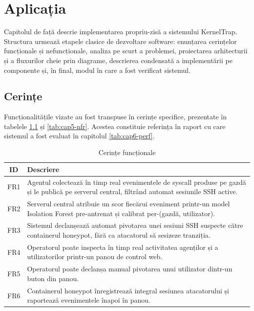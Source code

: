 
\chapter{Aplicația}

Capitolul de față descrie implementarea propriu-zisă a sistemului KernelTrap.
Structura urmează etapele clasice de dezvoltare software: enunțarea
cerințelor funcționale și nefuncționale, analiza pe scurt a problemei,
proiectarea arhitecturii și a fluxurilor cheie prin diagrame, descrierea
condensată a implementării pe componente și, în final, modul în care a fost
verificat sistemul.


\section{Cerințe}


Funcționalitățile vizate au fost transpuse în cerințe specifice, prezentate
în tabelele \ref{tab:cap5-fr} și \ref{tab:cap5-nfr}. Acestea constituie
referința în raport cu care sistemul a fost evaluat în capitolul \ref{tab:cap6-perf}.

\begin{table}[h]
  \centering
  \caption{Cerințe funcționale}
  \label{tab:cap5-fr}
  \renewcommand{\arraystretch}{1.08}
  \begin{tabular}{|c|p{}|}
    \hline
    \textbf{ID} & \textbf{Descriere} \\
    \hline\hline
    FR1 & Agentul colectează în timp real evenimentele de syscall produse pe gazdă și le publică pe serverul central, filtrând automat sesiunile SSH active. \\
    \hline
    FR2 & Serverul central atribuie un scor fiecărui eveniment printr-un model Isolation Forest pre-antrenat și calibrat per-(gazdă, utilizator). \\
    \hline
    FR3 & Sistemul declanșează automat pivotarea unei sesiuni SSH suspecte către containerul honeypot, fără ca atacatorul să sesizeze tranziția. \\
    \hline
    FR4 & Operatorul poate inspecta în timp real activitatea agenților și a utilizatorilor printr-un panou de control web. \\
    \hline
    FR5 & Operatorul poate declanșa manual pivotarea unui utilizator dintr-un buton din panou. \\
    \hline
    FR6 & Containerul honeypot înregistrează integral sesiunea atacatorului și raportează evenimentele înapoi în panou. \\
    \hline
  \end{tabular}
\end{table}


